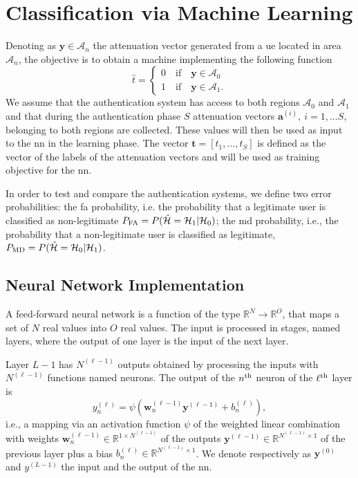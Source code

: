 \documentclass[twocolumns]{IEEEtran}
\begin{document}
\section{Classification via Machine Learning}\label{sec: ml}
Denoting as $\bm{y}\in \mathcal{A}_n$ the attenuation vector generated from a \ac{ue} located in area $\mathcal{A}_{n}$, the objective is to obtain a machine implementing the following function
\begin{equation}
  \hat{t} =
  \begin{cases}
  0 \quad \text{if} \quad \bm{y} \in \mathcal{A}_0\\
  1 \quad \text{if} \quad \bm{y} \in \mathcal{A}_1.
  \end{cases}
\end{equation}
We assume that the authentication system has access to both regions $\mathcal{A}_0$ and $\mathcal{A}_1$ and that during the authentication phase $S$ attenuation vectors $\bm{a}^{(i)}, \ i=1,\dots S$,  belonging to both regions are collected. These values will then be used as input to the \ac{nn} in the learning phase. The vector $\bm{t}=[t_1,...,t_S]$ is defined as the vector of the labels of the attenuation vectors and will be used as training objective for the \ac{nn}.

In order to test and compare the authentication systems, we define two error probabilities: the \ac{fa} probability, i.e. the probability  that a legitimate user is classified as non-legitimate $P_{\rm FA} =P(\hat{\mathcal H} = \mathcal H_1 | \mathcal H_0)$; the \ac{md} probability, i.e., the probability that a non-legitimate user is classified as legitimate, $P_{\rm MD}=P(\hat{\mathcal H} = \mathcal H_0 | \mathcal H_1)$.

\subsection{Neural Network Implementation}\label{sec:nn}
A feed-forward neural network is a function of the type $\mathbb{R}^N \to \mathbb{R}^O$, that maps a set of $N$ real values into $O$ real values. The input is processed in stages, named layers, where the output of one layer is the input of the next layer.

Layer $L-1$ has $N^{(\ell-1)}$ outputs obtained by processing the inputs with $N^{(\ell-1)}$ functions named neurons. The output of the $n^{\rm th}$ neuron of the $\ell^{\rm th}$ layer is
\begin{equation}\label{eq:nonLin}
y_n^{(\ell)} = \psi\left( \bm{w}_n^{(\ell -1)}\bm{y}^{(\ell-1)}+b_n^{(\ell)} \right),
\end{equation}
i.e., a mapping via an activation function $\psi$ of the weighted linear combination with weights $\bm{w}_n^{(\ell -1)}\in \mathbb{R}^{1\times N^{(\ell-1)}}$ of the outputs $\bm{y}^{(\ell-1)} \in \mathbb{R}^{N^{(\ell-1)} \times 1 }$ of the previous layer plus a bias $b_n^{(\ell)} \in \mathbb{R}^{N^{(\ell-1)} \times 1 }$. We denote respectively as $\bm{y}^{(0)}$ and $y^{(L-1)}$ the input and the output of the \ac{nn}. 
\end{document}
